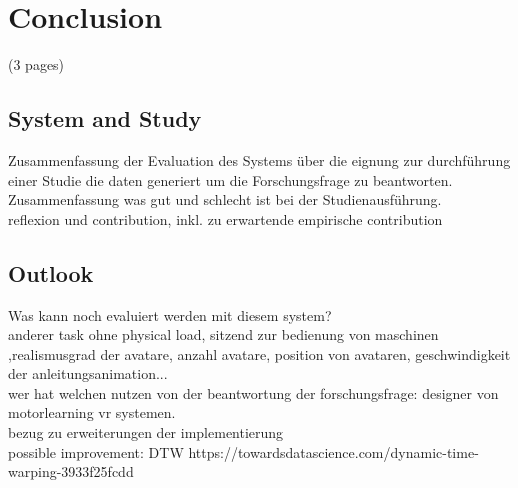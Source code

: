 \chapter{Conclusion}
\label{chapter:conclusion}
(3 pages)
\section{System and Study}
Zusammenfassung der Evaluation des Systems über die eignung zur durchführung einer Studie die daten generiert um die Forschungsfrage zu beantworten.\\
Zusammenfassung was gut und schlecht ist bei der Studienausführung.\\
reflexion und contribution, inkl. zu erwartende empirische contribution\\
\section{Outlook}
\label{section:study_improvements}
Was kann noch evaluiert werden mit diesem system?\\
anderer task ohne physical load, sitzend zur bedienung von maschinen ,realismusgrad der avatare, anzahl avatare, position von avataren, geschwindigkeit der anleitungsanimation...\\
wer hat welchen nutzen von der beantwortung der forschungsfrage: designer von motorlearning vr systemen.\\
bezug zu erweiterungen der implementierung\\
possible improvement: DTW https://towardsdatascience.com/dynamic-time-warping-3933f25fcdd\\